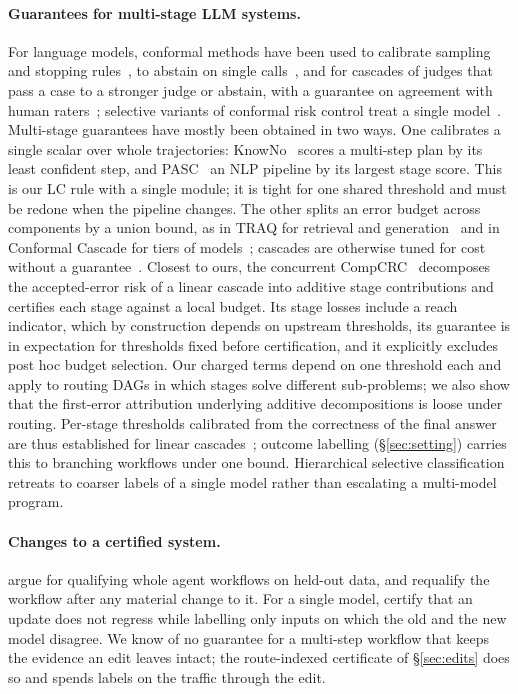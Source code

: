 \documentclass[11pt]{article}
\theoremstyle{definition}
\theoremstyle{remark}
\begin{document}
\paragraph{Guarantees for multi-stage LLM systems.} For language models, conformal methods
have been used to calibrate sampling and stopping rules~\citep{quach2024clm}, to abstain on
single calls~\citep{yadkori2024abstention}, and for cascades of judges that pass a case to a
stronger judge or abstain, with a guarantee on agreement with human
raters~\citep{jung2024trust}; selective variants of conformal risk control treat a single
model~\citep{xu2025selective}. Multi-stage guarantees have mostly been obtained in two ways.
One calibrates a single scalar over whole trajectories: KnowNo~\citep{ren2023knowno} scores a
multi-step plan by its least confident step, and PASC~\citep{kotte2026pasc} an NLP pipeline
by its largest stage score. This is our LC rule with a single module; it is tight for one
shared threshold and must be redone when the pipeline changes. The other splits an error
budget across components by a union bound, as in TRAQ for retrieval and
generation~\citep{li2023traq} and in Conformal Cascade for tiers of
models~\citep{dou2026cascade}; cascades are otherwise tuned for cost without a
guarantee~\citep{chen2023frugalgpt}. Closest to ours, the
concurrent CompCRC~\citep{sun2026compcrc} decomposes the accepted-error risk of a linear
cascade into additive stage contributions and certifies each stage against a local budget. Its
stage losses include a reach indicator, which by construction depends on upstream thresholds,
its guarantee is in expectation for thresholds fixed before certification, and it explicitly
excludes post hoc budget selection. Our charged terms depend on one threshold each and apply
to routing DAGs in which stages solve different sub-problems; we also show that the
first-error attribution underlying additive decompositions is loose under routing.
Per-stage thresholds calibrated from the correctness of the final answer are thus
established for linear cascades~\citep{jung2024trust,dou2026cascade,sun2026compcrc,badshah2026judge};
outcome labelling (\S\ref{sec:setting}) carries this to branching workflows under one bound.
Hierarchical selective classification~\citep{goren2024hierarchical} retreats to coarser labels
of a single model rather than escalating a multi-model program.

\paragraph{Changes to a certified system.} \citet{chatrath2026ready} argue for qualifying
whole agent workflows on held-out data, and requalify the workflow after any material change
to it. For a single model, \citet{balachandran2026disagreement} certify that an update does
not regress while labelling only inputs on which the old and the new model disagree. We know
of no guarantee for a multi-step workflow that keeps the evidence an edit leaves intact; the
route-indexed certificate of \S\ref{sec:edits} does so and spends labels on the traffic through
the edit.
\end{document}
